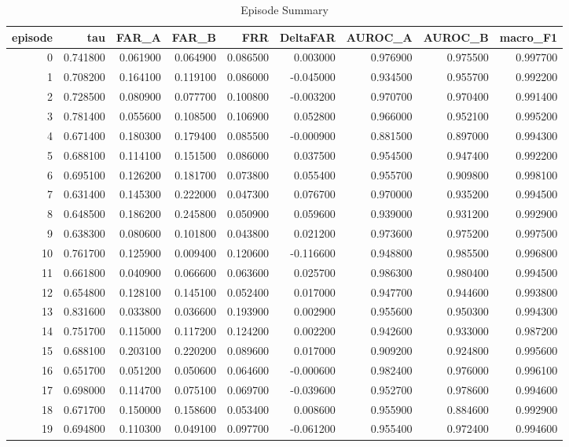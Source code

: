 \begin{table}
\caption{Episode Summary}
\label{tab_episode_summary}
\begin{tabular}{rrrrrrrrr}
\toprule
episode & tau & FAR_A & FAR_B & FRR & DeltaFAR & AUROC_A & AUROC_B & macro_F1 \\
\midrule
0 & 0.741800 & 0.061900 & 0.064900 & 0.086500 & 0.003000 & 0.976900 & 0.975500 & 0.997700 \\
1 & 0.708200 & 0.164100 & 0.119100 & 0.086000 & -0.045000 & 0.934500 & 0.955700 & 0.992200 \\
2 & 0.728500 & 0.080900 & 0.077700 & 0.100800 & -0.003200 & 0.970700 & 0.970400 & 0.991400 \\
3 & 0.781400 & 0.055600 & 0.108500 & 0.106900 & 0.052800 & 0.966000 & 0.952100 & 0.995200 \\
4 & 0.671400 & 0.180300 & 0.179400 & 0.085500 & -0.000900 & 0.881500 & 0.897000 & 0.994300 \\
5 & 0.688100 & 0.114100 & 0.151500 & 0.086000 & 0.037500 & 0.954500 & 0.947400 & 0.992200 \\
6 & 0.695100 & 0.126200 & 0.181700 & 0.073800 & 0.055400 & 0.955700 & 0.909800 & 0.998100 \\
7 & 0.631400 & 0.145300 & 0.222000 & 0.047300 & 0.076700 & 0.970000 & 0.935200 & 0.994500 \\
8 & 0.648500 & 0.186200 & 0.245800 & 0.050900 & 0.059600 & 0.939000 & 0.931200 & 0.992900 \\
9 & 0.638300 & 0.080600 & 0.101800 & 0.043800 & 0.021200 & 0.973600 & 0.975200 & 0.997500 \\
10 & 0.761700 & 0.125900 & 0.009400 & 0.120600 & -0.116600 & 0.948800 & 0.985500 & 0.996800 \\
11 & 0.661800 & 0.040900 & 0.066600 & 0.063600 & 0.025700 & 0.986300 & 0.980400 & 0.994500 \\
12 & 0.654800 & 0.128100 & 0.145100 & 0.052400 & 0.017000 & 0.947700 & 0.944600 & 0.993800 \\
13 & 0.831600 & 0.033800 & 0.036600 & 0.193900 & 0.002900 & 0.955600 & 0.950300 & 0.994300 \\
14 & 0.751700 & 0.115000 & 0.117200 & 0.124200 & 0.002200 & 0.942600 & 0.933000 & 0.987200 \\
15 & 0.688100 & 0.203100 & 0.220200 & 0.089600 & 0.017000 & 0.909200 & 0.924800 & 0.995600 \\
16 & 0.651700 & 0.051200 & 0.050600 & 0.064600 & -0.000600 & 0.982400 & 0.976000 & 0.996100 \\
17 & 0.698000 & 0.114700 & 0.075100 & 0.069700 & -0.039600 & 0.952700 & 0.978600 & 0.994600 \\
18 & 0.671700 & 0.150000 & 0.158600 & 0.053400 & 0.008600 & 0.955900 & 0.884600 & 0.992900 \\
19 & 0.694800 & 0.110300 & 0.049100 & 0.097700 & -0.061200 & 0.955400 & 0.972400 & 0.994600 \\
\bottomrule
\end{tabular}
\end{table}
